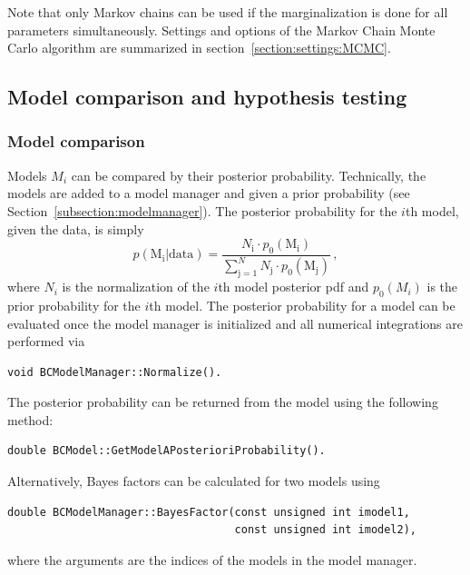 \documentclass[11pt, a4paper]{article}
\begin{document}
Note that only Markov chains can be used if the marginalization is
done for all parameters simultaneously. Settings and options of the
Markov Chain Monte Carlo algorithm are summarized in
section~\ref{section:settings:MCMC}.


\subsection{Model comparison and hypothesis testing}


\subsubsection{Model comparison}

Models $M_{i}$ can be compared by their posterior
probability. Technically, the models are added to a model manager and
given a prior probability (see
Section~\ref{subsection:modelmanager}). The posterior probability for
the $i$th model, given the data, is simply
%
\begin{equation}
p(\mathrm{M_{i}}|\mathrm{data}) = \frac{N_{\mathrm{i}} \cdot p_{0}(\mathrm{M_{i}})}{\sum_{\mathrm{j} = 1}^{N} N_{\mathrm{j}} \cdot p_{0}(\mathrm{M_{j}})} \, ,
\end{equation}
%
where $N_{i}$ is the normalization of the $i$th model posterior pdf
and $p_{0}(M_{i})$ is the prior probability for the $i$th model. The
posterior probability for a model can be evaluated once the model
manager is initialized and all numerical integrations are performed
via
%
\begin{verbatim}
void BCModelManager::Normalize().
\end{verbatim}
%
The posterior probability can be returned from the model using the
following method:
%
\begin{verbatim}
double BCModel::GetModelAPosterioriProbability().
\end{verbatim}

Alternatively, Bayes factors can be calculated for two models using
%
\begin{verbatim}
double BCModelManager::BayesFactor(const unsigned int imodel1,
                                   const unsigned int imodel2),
\end{verbatim}
%
where the arguments are the indices of the models in the model
manager.
\end{document}
